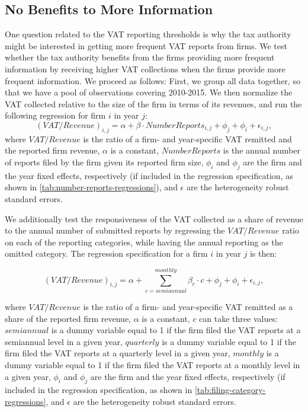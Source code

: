 \subsection{No Benefits to More Information}
\label{subsec:3-methodology-more-information}
One question related to the VAT reporting thresholds is why the tax authority might be interested in getting more frequent VAT reports from firms. We test whether the tax authority benefits from the firms providing more frequent information by receiving higher VAT collections when the firms provide more frequent information. We proceed as follows: First, we group all data together, so that we have a pool of observations covering 2010-2015. We then normalize the VAT collected relative to the size of the firm in terms of its revenues, and run the following regression for firm $i$ in year $j$:
\begin{equation}
  (VAT/Revenue)_{i,j}=\alpha+\beta\cdot NumberReports_{i,j}+\phi_{j}+\phi_{i}+\epsilon_{i,j},
\end{equation}
where $VAT/Revenue$ is the ratio of a firm- and year-specific VAT remitted and the reported firm revenue, $\alpha$ is a constant, $NumberReports$ is the annual number of reports filed by the firm given its reported firm size, $\phi_{i}$ and $\phi_{j}$ are the firm and the year fixed effects, respectively (if included in the regression specification, as shown in \cref{tab:number-reports-regressions}), and $\epsilon$ are the heterogeneity robust standard errors.

We additionally test the responsiveness of the VAT collected as a share of revenue to the annual number of submitted reports by regressing the $VAT/Revenue$ ratio on each of the reporting categories, while having the annual reporting as the omitted category. The regression specification for a firm $i$ in year $j$ is then:

\begin{equation}
  (VAT/Revenue)_{i,j}=\alpha+\sum_{c=semiannual}^{monthly}\beta_{c}\cdot c+\phi_{j}+\phi_{i}+\epsilon_{i,j},
\end{equation}

where $VAT/Revenue$ is the ratio of a firm- and year-specific VAT remitted as a share of the reported firm revenue, $\alpha$ is a constant, $c$ can take three values: $semiannual$ is a dummy variable equal to 1 if the firm filed the VAT reports at a semiannual level in a given year, $quarterly$ is a dummy variable equal to 1 if the firm filed the VAT reports at a quarterly level in a given year, $monthly$ is a dummy variable equal to 1 if the firm filed the VAT reports at a monthly level in a given year, $\phi_{i}$ and $\phi_{j}$ are the firm and the year fixed effects, respectively (if included in the regression specification, as shown in \cref{tab:filing-category-regressions}, and $\epsilon$ are the heterogeneity robust standard errors.


